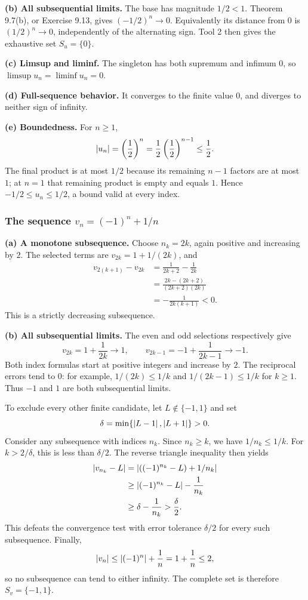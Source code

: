 \textbf{(b) All subsequential limits.}
The base has magnitude $1/2<1$. Theorem 9.7(b), or
Exercise 9.13, gives
$(-1/2)^n\to0$. Equivalently its distance from $0$ is
$(1/2)^n\to0$, independently of the alternating sign.
Tool 2 then gives the exhaustive set $S_u=\{0\}$.

\textbf{(c) Limsup and liminf.}
The singleton has both supremum and infimum $0$, so
$\limsup u_n=\liminf u_n=0$.

\textbf{(d) Full-sequence behavior.}
It converges to the finite value $0$, and diverges to neither
sign of infinity.

\textbf{(e) Boundedness.}
For $n\geq1$,
\[
 \left|u_n\right|=\left(\frac12\right)^n
 =\frac12\left(\frac12\right)^{n-1}\leq\frac12.
\]
The final product is at most $1/2$ because its remaining
$n-1$ factors are at most $1$; at $n=1$ that remaining
product is empty and equals $1$. Hence
$-1/2\leq u_n\leq1/2$, a bound valid at every index.

\subsubsection*{The sequence $v_n=(-1)^n+1/n$}

\textbf{(a) A monotone subsequence.}
Choose $n_k=2k$, again positive and increasing by $2$.
The selected terms are $v_{2k}=1+1/(2k)$, and
\begin{align*}
 v_{2(k+1)}-v_{2k}
 &=\frac1{2k+2}-\frac1{2k}\\
 &=\frac{2k-(2k+2)}{(2k+2)(2k)}\\
 &=-\frac1{2k(k+1)}<0.
\end{align*}
This is a strictly decreasing subsequence.

\textbf{(b) All subsequential limits.}
The even and odd selections respectively give
\[
 v_{2k}=1+\frac1{2k}\longrightarrow1,
 \qquad
 v_{2k-1}=-1+\frac1{2k-1}\longrightarrow-1.
\]
Both index formulas start at positive integers and increase
by $2$. The reciprocal errors tend to $0$: for example,
$1/(2k)\leq1/k$ and $1/(2k-1)\leq1/k$ for $k\geq1$.
Thus $-1$ and $1$ are both subsequential limits.

To exclude every other finite candidate, let $L\notin\{-1,1\}$
and set
\[
 \delta=\min\{\left|L-1\right|,\left|L+1\right|\}>0.
\]
Consider any subsequence with indices $n_k$. Since $n_k\geq k$,
we have $1/n_k\leq1/k$. For $k>2/\delta$, this is less
than $\delta/2$. The reverse triangle inequality then yields
\begin{align*}
 \left|v_{n_k}-L\right|
 &=\left|((-1)^{n_k}-L)+1/n_k\right|\\
 &\geq\left|(-1)^{n_k}-L\right|-\frac1{n_k}\\
 &\geq\delta-\frac1{n_k}>\frac\delta2.
\end{align*}
This defeats the convergence test with error tolerance
$\delta/2$ for every such subsequence. Finally,
\[
 \left|v_n\right|\leq\left|(-1)^n\right|+\frac1n
 =1+\frac1n\leq2,
\]
so no subsequence can tend to either infinity. The complete
set is therefore $S_v=\{-1,1\}$.

